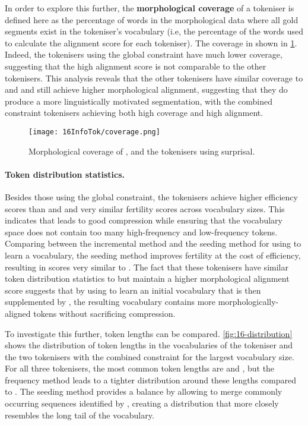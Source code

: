 In order to explore this further, the \textbf{morphological coverage} of a tokeniser is defined here as the percentage of words in the morphological data where all gold segments exist in the tokeniser's vocabulary (i.e, the percentage of the words used to calculate the alignment score for each tokeniser). The coverage in shown in \cref{fig:16-coverage}. Indeed, the tokenisers using the global constraint have much lower coverage, suggesting that the high alignment score is not comparable to the other tokenisers. This analysis reveals that the other \bytespan tokenisers have similar coverage to \bpe and \bpewp and still achieve higher morphological alignment, suggesting that they do produce a more linguistically motivated segmentation, with the combined constraint tokenisers achieving both high coverage and high alignment. 

\begin{figure}[!t]
    \centering
    \texttt{[image: 16InfoTok/coverage.png]}
    \caption{Morphological coverage of \bpe, \bpewp and the \bytespan tokenisers using surprisal.}
    \label{fig:16-coverage}
\end{figure}

\paragraph{Token distribution statistics.}

Besides those using the global constraint, the \bytespan tokenisers achieve higher \renyi efficiency scores than \bpe and \bpewp and very similar fertility scores across vocabulary sizes. This indicates that \bytespan leads to good compression while ensuring that the vocabulary space does not contain too many high-frequency and low-frequency tokens. Comparing between the incremental method and the seeding method for using \bytespan to learn a vocabulary, the seeding method improves fertility at the cost of \renyi efficiency, resulting in scores very similar to \bpewp. The fact that these tokenisers have similar token distribution statistics to \bpewp but maintain a higher morphological alignment score suggests that by using \bytespan to learn an initial vocabulary that is then supplemented by \bpe, the resulting vocabulary contains more morphologically-aligned tokens without sacrificing compression.

To investigate this further, token lengths can be compared. \cref{fig:16-distribution} shows the distribution of token lengths in the vocabularies of the \bpewp tokeniser and the two \bytespan tokenisers with the combined constraint for the largest vocabulary size. For all three tokenisers, the most common token lengths are  and , but the frequency method leads to a tighter distribution around these lengths compared to \bpewp. The seeding method provides a balance by allowing \bpe to merge commonly occurring sequences identified by \bytespan, creating a distribution that more closely resembles the long tail of the \bpewp vocabulary.

